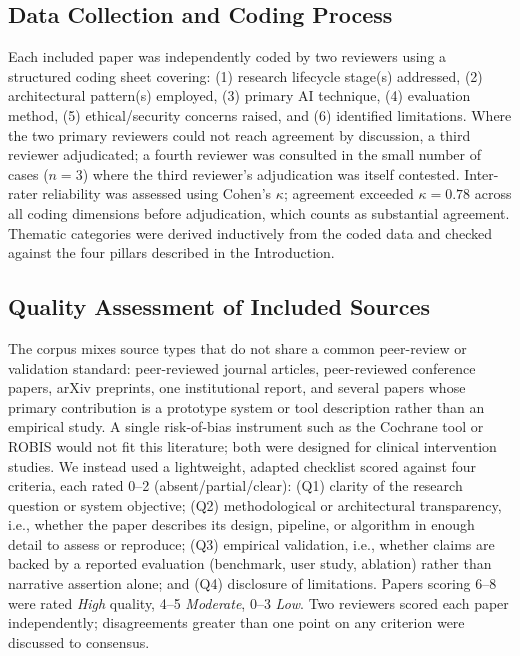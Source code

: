 \documentclass[sn-basic,Numbered]{sn-jnl}
\begin{document}
\subsection{Data Collection and Coding Process}

Each included paper was independently coded by two reviewers using a
structured coding sheet covering: (1) research lifecycle stage(s)
addressed, (2) architectural pattern(s) employed, (3) primary AI
technique, (4) evaluation method, (5) ethical/security concerns raised,
and (6) identified limitations. Where the two primary reviewers could
not reach agreement by discussion, a third reviewer adjudicated; a
fourth reviewer was consulted in the small number of cases ($n=3$)
where the third reviewer's adjudication was itself contested.
Inter-rater reliability was assessed using Cohen's $\kappa$; agreement
exceeded $\kappa = 0.78$ \cite{landis1977kappa} across all coding
dimensions before adjudication, which counts as substantial agreement.
Thematic categories were derived inductively from the coded data and
checked against the four pillars described in the Introduction.

\subsection{Quality Assessment of Included Sources}
\label{sec:quality}
The corpus mixes source types that do not share a common peer-review or validation standard: peer-reviewed journal articles, peer-reviewed conference papers, arXiv preprints, one institutional report, and several papers whose primary contribution is a prototype system or tool description rather than an empirical study. A single risk-of-bias instrument such as the Cochrane tool or ROBIS would not fit this literature; both were designed for clinical intervention studies. We instead used a lightweight, adapted checklist scored against four criteria, each rated 0–2 (absent/partial/clear): (Q1) clarity of the research question or system objective; (Q2) methodological or architectural transparency, i.e., whether the paper describes its design, pipeline, or algorithm in enough detail to assess or reproduce; (Q3) empirical validation, i.e., whether claims are backed by a reported evaluation (benchmark, user study, ablation) rather than narrative assertion alone; and (Q4) disclosure of limitations. Papers scoring 6–8 were rated \emph{High} quality, 4–5 \emph{Moderate}, 0–3 \emph{Low}. Two reviewers scored each paper independently; disagreements greater than one point on any criterion were discussed to consensus.
\end{document}
